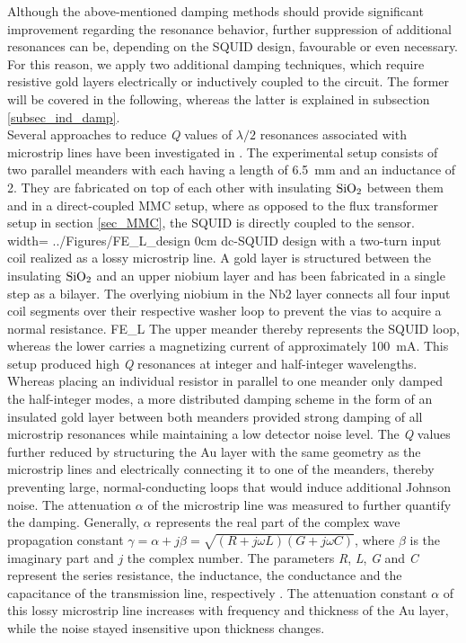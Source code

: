 Although the above-mentioned damping methods should provide significant improvement regarding the resonance behavior, further suppression of additional resonances can be, depending on the SQUID design, favourable or even necessary. For this reason, we apply two additional damping techniques, which require resistive gold layers electrically or inductively coupled to the circuit. The former will be covered in the following, whereas the latter is explained in subsection \ref{subsec_ind_damp}. \\
Several approaches to reduce \textit{Q} values of $\lambda/2$ resonances associated with microstrip lines have been investigated in \cite{Boyd2022}. The experimental setup consists of two parallel meanders with each having a length of \qty{6.5}{\milli\metre} and an inductance of \qty{2}{\nH}. They are fabricated on top of each other with insulating $\rm SiO_2$ between them and in a direct-coupled MMC setup, where as opposed to the flux transformer setup in section \ref{sec_MMC}, the SQUID is directly coupled to the sensor. 
{width=\textwidth}
{../Figures/FE_L_design}
{0cm}
{dc-SQUID design with a two-turn input coil realized as a lossy microstrip line. A gold layer is structured between the insulating $\rm SiO_2$ and an upper niobium layer and has been fabricated in a single step as a bilayer. The overlying niobium in the Nb2 layer connects all four input coil segments over their respective washer loop to prevent the vias to acquire a normal resistance.} 
{FE_L}
The upper meander thereby represents the SQUID loop, whereas the lower carries a magnetizing current of approximately \qty{100}{\milli\ampere}. This setup produced high \textit{Q} resonances at integer and half-integer wavelengths. Whereas placing an individual resistor in parallel to one meander only damped the half-integer modes, a more distributed damping scheme in the form of an insulated gold layer between both meanders provided strong damping of all microstrip resonances while maintaining a low detector noise level. The \textit{Q} values further reduced by structuring the Au layer with the same geometry as the microstrip lines and electrically connecting it to one of the meanders, thereby preventing large, normal-conducting loops that would induce additional Johnson noise. The attenuation $\alpha$ of the microstrip line was measured to further quantify the damping. Generally, $\alpha$ represents the real part of the complex wave propagation constant $\gamma=\alpha+j\beta=\sqrt{(R+j\omega L)(G+j\omega C)}$, where $\beta$ is the imaginary part and $j$ the complex number. The parameters \textit{R}, \textit{L}, \textit{G} and \textit{C} represent the series resistance, the inductance, the conductance and the capacitance of the transmission line, respectively \cite{Pozar2011}.
The attenuation constant $\alpha$ of this lossy microstrip line increases with frequency and thickness of the Au layer, while the noise stayed insensitive upon thickness changes. 

